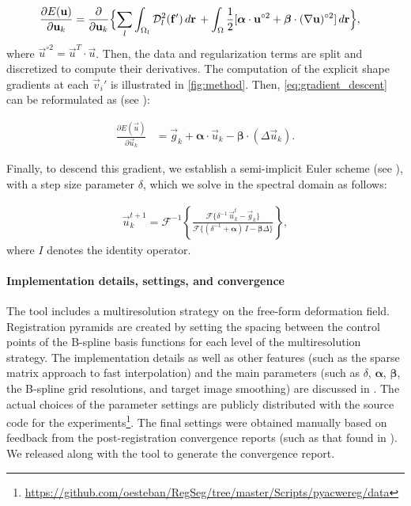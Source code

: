   \begin{align}
  \frac{\partial E(\vec{u})}{\partial \vec{u}_k} &=
  \frac{ \partial }{\partial \vec{u}_k} \Big\{
  \underset{l}{\sum} \int_{\Omega_l} \mdist{f'}{l} \,d\vec{r} \, +   \int_{\Omega} \frac12 [ \boldsymbol{\alpha} \cdot \vec{u}^{\circ2}
  + \boldsymbol{\beta} \cdot (\nabla \vec{u})^{\circ2} ] \,d\vec{r}
  \Big\},
  \label{eq:gradient_descent}
  \end{align}
  where $\vec{u}^{\circ2} = \vec{u}^T \cdot \vec{u}$.
Then, the data and regularization terms are split and discretized to compute their
  derivatives.
The computation of the explicit shape gradients at each $\vec{v}_i'$ is illustrated in \autoref{fig:method}.
Then, \eqref{eq:gradient_descent} can be reformulated as (see ):

  \begin{align}
  \frac{\partial E(\vec{u})}{\partial \vec{u}_k} &=
  \vec{g}_k  + \boldsymbol{\alpha} \cdot \vec{u}_k - \boldsymbol{\beta} \cdot (\Delta \vec{u}_k).
  \label{eq:final_gradient}
  \end{align}

Finally, to descend this gradient, we establish a semi-implicit Euler scheme (see ),
  with a step size parameter $\delta$, which we solve in the spectral domain as follows:

  \begin{align}
  \vec{u}_k^{t+1} = \mathcal{F}^{-1}\left\{ \frac{\mathcal{F}\{\delta^{-1} \, \vec{u}_k^t - \vec{g}_k\} }
                    {\mathcal{F}\{(\delta^{-1} + \boldsymbol{\alpha})\, I - \boldsymbol{\beta}\Delta\}} \right\},
  \label{eq:update_equation}
  \end{align}
  where $I$ denotes the identity operator.


\paragraph*{Implementation details, settings, and convergence}
\label{sec:conv_report}
The \regseg{} tool includes a multiresolution strategy on the free-form deformation field.
Registration pyramids are created by setting the spacing between the control points of the B-spline basis
  functions for each level of the multiresolution strategy.
The implementation details as well as other features (such as the sparse matrix approach
  to fast interpolation) and the main parameters
  (such as $\delta$, $\boldsymbol{\alpha}$, $\boldsymbol{\beta}$, the B-spline grid resolutions,
 and target image smoothing) are discussed in .
The actual choices of the parameter settings are publicly distributed with the source code for the
  experiments\footnote{\url{https://github.com/oesteban/RegSeg/tree/master/Scripts/pyacwereg/data}}.
The final settings were obtained manually based on feedback from the post-registration convergence
  reports (such as that found in ).
We released \regseg{} along with the tool to generate the convergence report.

